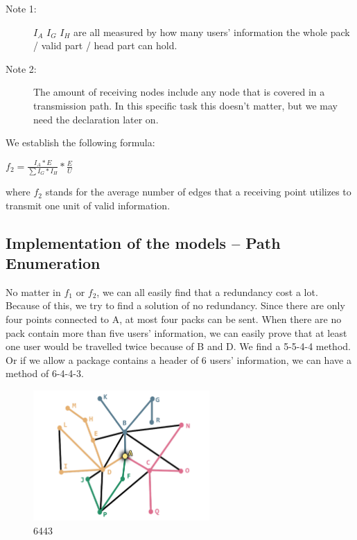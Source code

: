 \documentclass{mcmthesis}
\begin{document}
%	
%	
%	
%	
\begin{description}
	\item[Note 1: ] $I_{A}$ $I_{G}$ $I_{H}$ are all measured by how many users' information the whole pack / valid part / head part can hold.
	\item[Note 2: ] The amount of receiving nodes include any node that is covered in a transmission path. In this specific task this doesn't matter, but we may need the declaration later on.
\end{description}

We establish the following formula:

\quad$f_{2} = \frac{I_{A} * E}{\sum I_{G} * I_{H}} * \frac{E}{U}$


where $f_{2}$ stands for the average number of edges that a receiving point utilizes to transmit one unit of valid information.


\subsection{Implementation of the models -- Path Enumeration}

No matter in $f_{1}$ or $f_{2}$, we can all easily find that a redundancy cost a lot. Because of this, we try to find a solution of no redundancy. Since there are only four points connected to A, at most four packs can be sent. When there are no pack contain more than five users' information, we can easily prove that at least one user would be travelled twice because of B and D. We find a 5-5-4-4 method. 
Or if we allow a package contains a header of 6 users' information, we can have a method of 6-4-4-3.


\begin{figure}[H]
	\centering
	\includegraphics[width = 0.6\textwidth]{figure/6443.png}
	\caption{6443}
	\label{fig:1-2}
\end{figure}
\end{document}
